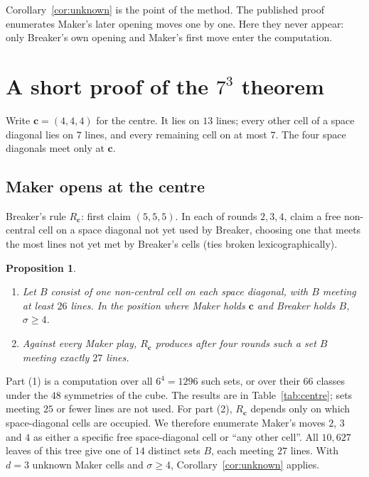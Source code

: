 \documentclass[11pt]{amsart}
\newtheorem{proposition}[theorem]{Proposition}
\theoremstyle{definition}
\theoremstyle{remark}
\newcommand{\cc}{\mathbf c}
\begin{document}
Corollary~\ref{cor:unknown} is the point of the method. The published proof enumerates Maker's later opening moves one by one. Here they never appear: only Breaker's own opening and Maker's first move enter the computation.

\section{A short proof of the \texorpdfstring{$7^3$}{7\textasciicircum 3} theorem}\label{sec:proof}

Write $\cc=(4,4,4)$ for the centre. It lies on $13$ lines; every other cell of a space diagonal lies on $7$ lines, and every remaining cell on at most $7$. The four space diagonals meet only at $\cc$.

\subsection*{Maker opens at the centre}
Breaker's rule $R_{\cc}$: first claim $(5,5,5)$. In each of rounds $2,3,4$, claim a free non-central cell on a space diagonal not yet used by Breaker, choosing one that meets the most lines not yet met by Breaker's cells (ties broken lexicographically).

\begin{proposition}\label{prop:centre}
\leavevmode
\begin{enumerate}
\item Let $B$ consist of one non-central cell on each space diagonal, with $B$ meeting at least $26$ lines. In the position where Maker holds $\cc$ and Breaker holds $B$, $\sigma\ge 4$.
\item Against every Maker play, $R_{\cc}$ produces after four rounds such a set $B$ meeting exactly $27$ lines.
\end{enumerate}
\end{proposition}

Part (1) is a computation over all $6^4=1296$ such sets, or over their $66$ classes under the $48$ symmetries of the cube. The results are in Table~\ref{tab:centre}; sets meeting $25$ or fewer lines are not used. For part (2), $R_{\cc}$ depends only on which space-diagonal cells are occupied. We therefore enumerate Maker's moves $2$, $3$ and $4$ as either a specific free space-diagonal cell or ``any other cell''. All $10{,}627$ leaves of this tree give one of $14$ distinct sets $B$, each meeting $27$ lines. With $d=3$ unknown Maker cells and $\sigma\ge4$, Corollary~\ref{cor:unknown} applies.
\end{document}
